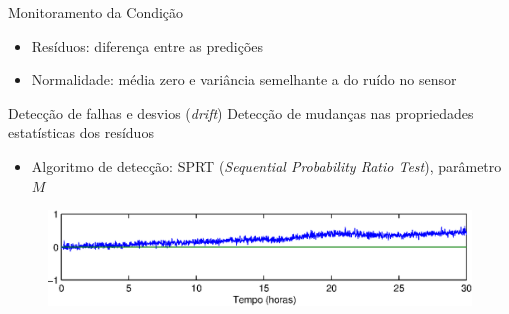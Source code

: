 \documentclass{beamer}
\begin{document}
\begin{frame}{Monitoramento da Condição}

    \begin{itemize}
        \item Resíduos: diferença entre as predições
        \item Normalidade: média zero e variância semelhante a do ruído no sensor
    \end{itemize}

    \begin{block}{Detecção de falhas e desvios (\textit{drift})}
        Detecção de mudanças nas propriedades estatísticas dos resíduos
    \end{block}

    \begin{itemize}
        \item Algoritmo de detecção: SPRT (\textit{Sequential Probability Ratio Test}),
            parâmetro $M$
    \end{itemize}

    \begin{figure}[!htb]
        \centering
        \includegraphics[width=\textwidth]{figuras/residual_ex.eps}
    \end{figure}

    
\end{frame}
\end{document}
